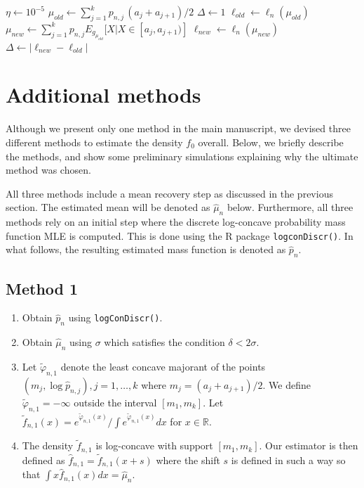 \documentclass[12pt]{article} %
\newcommand{\RR}{\mathbb {R}}
\begin{document}
\begin{algorithm}[h!]
\caption{EM algorithm}\label{alg:em}
\begin{algorithmic}
\State $\eta \gets 10^{-5}$
\State $\mu_{old} \gets  \sum_{j=1}^k p_{n,j} \, (a_j+a_{j+1})/2$
\State $\Delta \gets 1$
\While{$\Delta \geq \eta$}
\State $\ell_{old} \gets \ell_n(\mu_{old})$
\State $\mu_{new} \gets \sum_{j=1}^k p_{n,j} E_{g_{\mu_{old}}} [ X \vert X\in [a_j, a_{j+1}) ]$
\State $\ell_{new} \gets \ell_n(\mu_{new})$
\State $\Delta \gets |\ell_{new}-\ell_{old}|$
\EndWhile
\end{algorithmic}
\end{algorithm}


\section{Additional methods}\label{appendix:all}

Although we present only one method in the main manuscript, we devised three different methods to estimate the density $f_0$ overall.  Below, we briefly describe the methods, and show some preliminary simulations explaining why the ultimate method was chosen.  



All three methods include a mean recovery step as discussed in the previous section.   The estimated mean will be denoted as $\widehat \mu_n$ below.   Furthermore, all three methods rely on an initial step where the discrete log-concave probability mass function MLE is computed.   This is done using the R package \texttt{logconDiscr()}.   In what follows, the resulting estimated mass function is denoted as $\widehat p_n.$


\subsection{Method 1}

\begin{enumerate}
    \item Obtain $\widehat p_n$ using \texttt{logConDiscr()}.   %
    \item Obtain $\widehat \mu_n$ using $\sigma$ which satisfies the condition $\delta <  2 \sigma$.
    \item Let $\widetilde \varphi_{n,1}$ denote the least concave majorant of the points $(m_j, \log \widehat p_{n,j}), j=1, \ldots, k$ where $m_j = (a_j+a_{j+1})/2.$  We define $\widetilde \varphi_{n,1} = -\infty$ outside the interval $[m_1, m_k].$ Let $\widetilde f_{n,1} (x) = e^{\widetilde \varphi_{n,1}(x)}/\int e^{\widetilde \varphi_{n,1}(x)} dx$ for $x\in \RR.$
    \item  The density $\widetilde f_{n,1}$ is log-concave with support $[m_1, m_k]$.   Our estimator is then defined as $\widehat f_{n,1}=\widetilde f_{n,1}(x+s)$ where the shift $s$ is defined in such a way so that $\int x \widehat f_{n,1}(x)dx = \widehat \mu_n.$
\end{enumerate}
\end{document}
